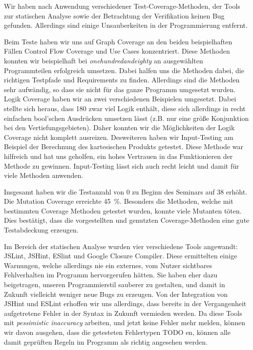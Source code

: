 \documentclass[ngerman]{article}
\begin{document}
Wir haben nach Anwendung verschiedener Test-Coverage-Methoden, der Tools zur statischen Analyse sowie der Betrachtung der Verifikation keinen Bug gefunden.
Allerdings sind einige Unsauberkeiten in der Programmierung entfernt.

Beim Teste haben wir uns auf Graph Coverage an den beiden beispielhaften Fällen Control Flow Coverage und Use Cases konzentriert.
Diese Methoden konnten wir beispielhaft bei \emph{onehundredandeighty} an ausgewählten Programmteilen erfolgreich umsetzen.
Dabei halfen uns die Methoden dabei, die richtigen Testpfade und Requirements zu finden.
Allerdings sind die Methoden sehr aufwändig, so dass sie nicht für das ganze Programm umgesetzt wurden.
Logik Coverage haben wir an zwei verschiedenen Beispielen umgesetzt.
Dabei stellte sich heraus, dass 180 zwar viel Logik enthält, diese sich allerdings in recht einfachen bool'schen Ausdrücken umsetzen lässt (z.B. nur eine größe Konjunktion bei den Vertiefungsgebieten).
Daher konnten wir die Möglichkeiten der Logik Coverage nicht komplett ausreizen.
Desweiteren haben wir Input-Testing am Beispiel der Berechnung des kartesischen Produkts getestet.
Diese Methode war hilfreich und hat uns geholfen, ein hohes Vertrauen in das Funktionieren der Methode zu gewinnen.
Input-Testing lässt sich auch recht leicht und damit für viele Methoden anwenden.

Insgesamt haben wir die Testanzahl von 0 zu Beginn des Seminars auf 38 erhöht.
Die Mutation Coverage erreichte 45~\%.
Besonders die Methoden, welche mit bestimmten Coverage Methoden getestet wurden, konnte viele Mutanten töten.
Dies bestätigt, dass die vorgestellten und genutzten Coverage-Methoden eine gute Testabdeckung erzeugen.

Im Bereich der statischen Analyse wurden vier verschiedene Tools angewandt: JSLint, JSHint, ESlint und Google Closure Compiler.
Diese ermittelten einige Warnungen, welche allerdings nie ein externes, vom Nutzer sichtbares Fehlverhalten im Programm hervorgerufen hätten.
Sie haben eher dazu beigetragen, unseren Programmierstil sauberer zu gestalten, und damit in Zukunft vielleicht weniger neue Bugs zu erzeugen.
Von der Integration von JSHint und ESLint erhoffen wir uns allerdings, dass bereits in der Vergangenheit aufgetretene Fehler in der Syntax in Zukunft vermieden werden.
Da diese Tools mit \emph{pessimistic inaccuracy} arbeiten, und jetzt keine Fehler mehr melden, können wir davon ausgehen, dass die getesteten Fehlertypen 
TODO
en, können alle damit geprüften Regeln im Programm als richtig angesehen werden.
\end{document}

